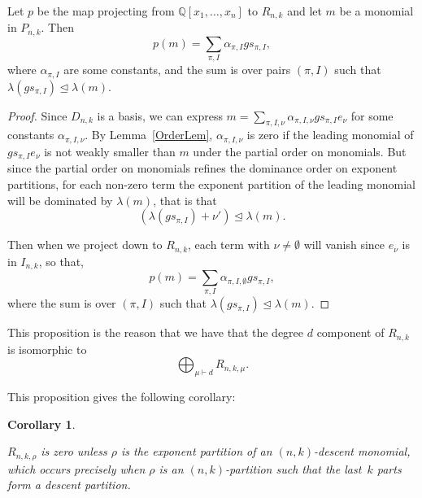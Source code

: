 \documentclass[10pt]{article}
\newtheorem{coro}[thm]{Corollary}
\begin{document}
\begin{prop}
\label{DomProp}
	Let $p$ be the map projecting from $\mathbb{Q}[x_1,\ldots, x_n]$ to $R_{n,k}$ and let $m$ be a monomial in $P_{n,k}$. Then 
		\begin{equation}
p(m)=\sum_{\pi,I} \alpha_{\pi,I} gs_{\pi,I},
\end{equation}
	 where $\alpha_{\pi,I}$ are some constants, and the sum is over pairs $(\pi,I)$ such that 
$\lambda(gs_{\pi,I})\trianglelefteq \lambda(m)$.

	\begin{proof}
		Since $D_{n,k}$ is a basis, we can express $m=\sum_{\pi,I,\nu} \alpha_{\pi,I,\nu} gs_{\pi,I} e_\nu$ for some constants 
$\alpha_{\pi,I,\nu}$. By Lemma~\ref{OrderLem}, $\alpha_{\pi,I,\nu}$ is zero if the leading monomial of $gs_{\pi,I} 
e_\nu$ is not weakly smaller than $m$ under the partial order on monomials. But since the partial order on monomials 
refines the dominance order on exponent partitions, for each non-zero term the exponent partition of the leading 
monomial will be dominated by $\lambda(m)$, that is that 
		\begin{equation}
(\lambda(gs_{\pi,I})+\nu')\trianglelefteq \lambda(m).
\end{equation}

	 Then when we project down to $R_{n,k}$, each term with $\nu\neq \emptyset$ will vanish since $e_\nu$ is in $I_{n,k}$, so 
that, 
		\begin{equation}
p(m)=\sum_{\pi,I}\alpha_{\pi,I,\emptyset} gs_{\pi,I},
\end{equation}
 where the sum is over $(\pi,I)$ such that $\lambda(gs_{\pi,I})\trianglelefteq \lambda(m)$.
	\end{proof}
\end{prop}

This proposition is the reason that we have that the degree $d$ component of $R_{n,k}$ is isomorphic to 
\begin{equation}
\bigoplus_{\mu\vdash d} R_{n,k,\mu}.
\end{equation}


This proposition gives the following corollary:

\begin{coro}
\label{zero}

	$R_{n,k,\rho}$ is zero unless $\rho$ is the exponent partition of an $(n,k)$-descent monomial, which occurs precisely when 
$\rho$ is an $(n,k)$-partition such that the last~$k$ parts form a descent partition.

\end{coro}
\end{document}
